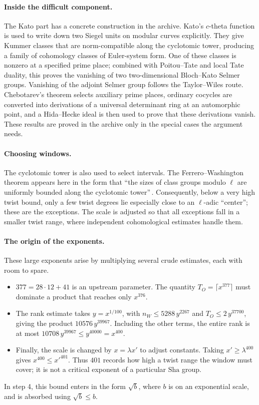 \documentclass[11pt]{article}
\newcommand{\Sha}{\mathrm{Sha}}
\begin{document}
\paragraph{Inside the difficult component.} The Kato part has a concrete construction in the archive. Kato's $c$-theta function is used to write down two Siegel units on modular curves explicitly. They give Kummer classes that are norm-compatible along the cyclotomic tower, producing a family of cohomology classes of Euler-system form. One of these classes is nonzero at a specified prime place; combined with Poitou--Tate and local Tate duality, this proves the vanishing of two two-dimensional Bloch--Kato Selmer groups. Vanishing of the adjoint Selmer group follows the Taylor--Wiles route. Chebotarev's theorem selects auxiliary prime places, ordinary cocycles are converted into derivations of a universal determinant ring at an automorphic point, and a Hida--Hecke ideal is then used to prove that these derivations vanish. These results are proved in the archive only in the special cases the argument needs.

\paragraph{Choosing windows.} The cyclotomic tower is also used to select intervals. The Ferrero--Washington theorem appears here in the form that ``the sizes of class groups modulo $\ell$ are uniformly bounded along the cyclotomic tower''\,\cite{fw}. Consequently, below a very high twist bound, only a few twist degrees lie especially close to an $\ell$-adic ``center''; these are the exceptions. The scale is adjusted so that all exceptions fall in a smaller twist range, where independent cohomological estimates handle them.

\paragraph{The origin of the exponents.} These large exponents arise by multiplying several crude estimates, each with room to spare.
\begin{itemize}
\item $377=28\cdot12+41$ is an upstream parameter. The quantity $T_O=\lceil x^{377}\rceil$ must dominate a product that reaches only $x^{376}$.
\item The rank estimate takes $y=x^{1/100}$, with $n_W\le5288\,y^{2267}$ and $T_O\le2\,y^{37700}$, giving the product $10576\,y^{39967}$. Including the other terms, the entire rank is at most $10708\,y^{39967}\le y^{40000}=x^{400}$.
\item Finally, the scale is changed by $x=\lambda x'$ to adjust constants. Taking $x'\ge\lambda^{400}$ gives $x^{400}\le x'^{401}$. Thus $401$ records how high a twist range the window must cover; it is not a critical exponent of a particular $\Sha$ group.
\end{itemize}
In step 4, this bound enters in the form $\sqrt b$, where $b$ is on an exponential scale, and is absorbed using $\sqrt b\le b$.
\end{document}
